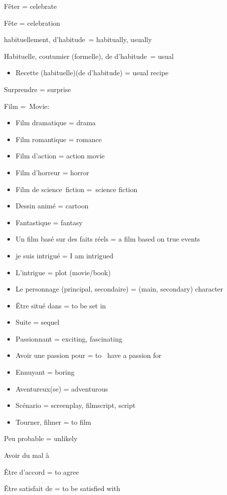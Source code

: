 Fêter = celebrate~

Fête = celebration~

habituellement, d'habitude~= habitually, usually

Habituelle, coutumier (formelle), de d'habitude~= usual~

\begin{itemize}
\item
  Recette (habituelle)(de d'habitude) = usual recipe~
\end{itemize}

Surprendre = surprise~

Film =~Movie:

\begin{itemize}
\item
  Film dramatique = drama
\item
  Film romantique = romance~
\item
  Film d'action = action movie~
\item
  Film d'horreur = horror~
\item
  Film de science~fiction =~science fiction~
\item
  Dessin animé = cartoon~
\item
  Fantastique = fantasy~
\item
  Un film basé sur des faits réels = a film based on true events~
\item
  {je suis intrigué =} {I am intrigued}
\item
  {L'intrigue = plot (movie/book)}
\item
  {Le personnage (principal, secondaire) = (main, secondary) character~}
\item
  {Être situé dans = to be set in}
\item
  {Suite = sequel}
\item
  {Passionnant = exciting, fascinating~}
\item
  {Avoir une passion pour = to~ have a passion for~}
\item
  {Ennuyant = boring}
\item
  Aventureux(se) = adventurous~
\item
  Scénario = screenplay, filmscript, script
\item
  Tourner, filmer = to film
\end{itemize}

Peu probable = unlikely~

Avoir du mal à~

Être d'accord = to agree~

Être satisfait de = to be satisfied with

